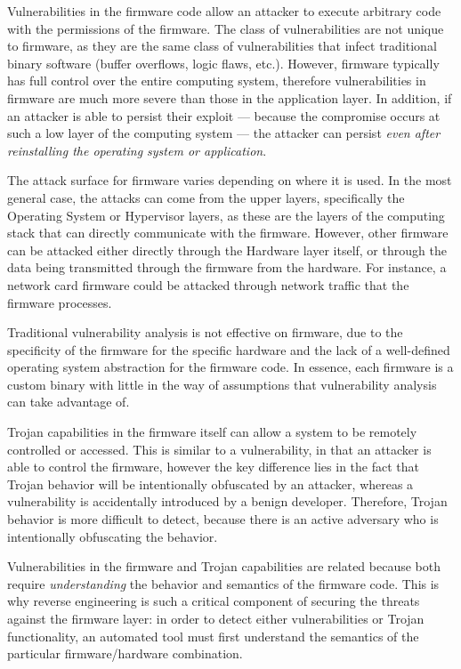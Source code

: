 \documentclass[11pt,letterpaper]{article}
\begin{document}
Vulnerabilities in the firmware code allow an attacker to execute
arbitrary code with the permissions of the firmware. The class of
vulnerabilities are not unique to firmware, as they are the same class
of vulnerabilities that infect traditional binary software (buffer
overflows, logic flaws, etc.). However, firmware typically has full
control over the entire computing system, therefore vulnerabilities in
firmware are much more severe than those in the application layer. In
addition, if an attacker is able to persist their exploit --- because the
compromise occurs at such a low layer of the computing system --- the
attacker can persist \emph{even after reinstalling the operating
  system or application}.

The attack surface for firmware varies depending on where it is used.
In the most general case, the attacks can come from the upper layers,
specifically the Operating System or Hypervisor layers, as these are
the layers of the computing stack that can directly communicate with the
firmware. However, other firmware can be attacked either directly
through the Hardware layer itself, or through the data being
transmitted through the firmware from the hardware. For instance, a
network card firmware could be attacked through network traffic that
the firmware processes.

Traditional vulnerability analysis is not effective on firmware, due
to the specificity of the firmware for the specific hardware and the
lack of a well-defined operating system abstraction for the firmware
code. In essence, each firmware is a custom binary with little in the
way of assumptions that vulnerability analysis can take advantage of. 

Trojan capabilities in the firmware itself can allow a system to be
remotely controlled or accessed. This is similar to a vulnerability,
in that an attacker is able to control the firmware, however the key
difference lies in the fact that Trojan behavior will be intentionally
obfuscated by an attacker, whereas a vulnerability is accidentally
introduced by a benign developer. Therefore, Trojan behavior is 
more difficult to detect, because there is an active adversary who is
intentionally obfuscating the behavior. 

Vulnerabilities in the firmware and Trojan capabilities are related
because both require \emph{understanding} the behavior and semantics
of the firmware code. This is why reverse engineering is such a
critical component of securing the threats against the firmware layer:
in order to detect either vulnerabilities or Trojan functionality, an
automated tool must first understand the semantics of the particular
firmware/hardware combination. 
\end{document}
